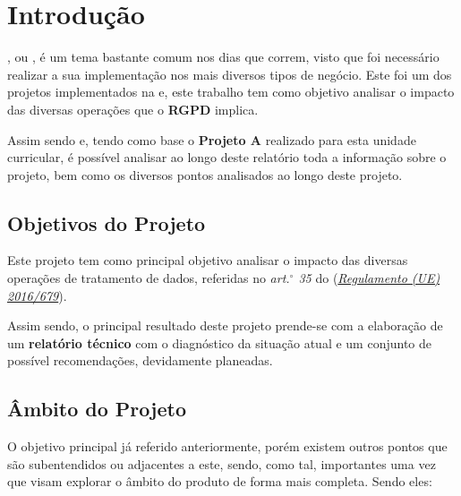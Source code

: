 \section{Introdução}

\textbf{}, ou \textbf{}, é um tema bastante comum nos dias que correm, visto que foi necessário realizar a sua implementação nos mais diversos tipos de negócio. Este foi um dos projetos implementados na \textbf{} e, este trabalho tem como objetivo analisar o impacto das diversas operações que o \textbf{RGPD} implica.

Assim sendo e, tendo como base o \textbf{Projeto A} realizado para esta unidade curricular,  é possível analisar ao longo deste relatório toda a informação sobre o projeto, bem como os diversos pontos analisados ao longo deste projeto.

\subsection{Objetivos do Projeto}

Este projeto tem como principal objetivo analisar o impacto das diversas operações de tratamento de dados, referidas no \textit{art.$^\circ$ 35} do \textbf{} (\href{https://eur-lex.europa.eu/legal-content/PT/TXT/PDF/?uri=CELEX:32016R0679&from=EN}{\textit{Regulamento (UE) 2016/679}}).

Assim sendo, o principal resultado deste projeto prende-se com a elaboração de um \textbf{relatório técnico} com o diagnóstico da situação atual e um conjunto de possível recomendações, devidamente planeadas.

\subsection{Âmbito do Projeto}

O objetivo principal já referido anteriormente, porém existem outros pontos que são subentendidos ou adjacentes a este, sendo, como tal, importantes uma vez que visam explorar o âmbito do produto de forma mais completa. Sendo eles:


